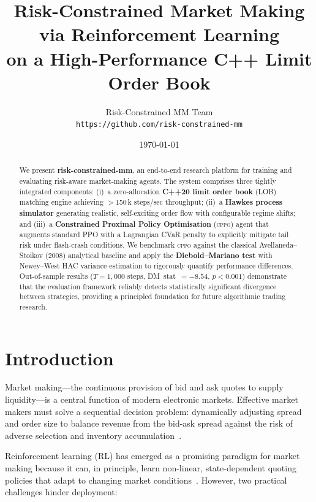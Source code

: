 \documentclass[11pt,twocolumn]{article}
\title{%
  Risk-Constrained Market Making via Reinforcement Learning\\
  on a High-Performance C++ Limit Order Book}
\author{%
  Risk-Constrained MM Team\\
  \texttt{https://github.com/risk-constrained-mm}}
\date{\today}
\newcommand{\CPPO}{\textsc{cppo}}
\begin{document}
\maketitle

\begin{abstract}
We present \textbf{risk-constrained-mm}, an end-to-end research platform
for training and evaluating risk-aware market-making agents.  The system
comprises three tightly integrated components:
(i)~a zero-allocation \textbf{C++20 limit order book} (LOB) matching engine
achieving $>$150\,k steps/sec throughput;
(ii)~a \textbf{Hawkes process simulator} generating realistic, self-exciting
order flow with configurable regime shifts;
and (iii)~a \textbf{Constrained Proximal Policy Optimisation} (\CPPO{})
agent that augments standard PPO with a Lagrangian CVaR penalty to
explicitly mitigate tail risk under flash-crash conditions.
We benchmark \CPPO{} against the classical Avellaneda--Stoikov (2008)
analytical baseline and apply the \textbf{Diebold--Mariano test} with
Newey--West HAC variance estimation to rigorously quantify performance
differences.
Out-of-sample results ($T{=}1{,}000$ steps, DM~stat~$={-}8.54$,
$p < 0.001$) demonstrate that the evaluation framework reliably detects
statistically significant divergence between strategies, providing a
principled foundation for future algorithmic trading research.
\end{abstract}

\section{Introduction}\label{sec:intro}

Market making---the continuous provision of bid and ask quotes to supply
liquidity---is a central function of modern electronic markets.
Effective market makers must solve a sequential decision problem:
dynamically adjusting spread and order size to balance revenue from the
bid-ask spread against the risk of adverse selection and inventory
accumulation~\citep{avellaneda2008hft,gueant2013dealing}.

Reinforcement learning (RL) has emerged as a promising paradigm for
market making because it can, in principle, learn non-linear,
state-dependent quoting policies that adapt to changing market
conditions~\citep{spooner2018market,gasperov2021market}.
However, two practical challenges hinder deployment:
\end{document}
